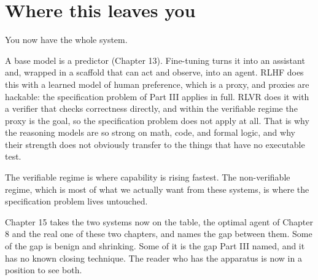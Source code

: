 \section*{Where this leaves you}

You now have the whole system.

A base model is a predictor (Chapter 13). Fine-tuning turns it into an assistant and, wrapped in a scaffold that can act and observe, into an agent. RLHF does this with a learned model of human preference, which is a proxy, and proxies are hackable: the specification problem of Part III applies in full. RLVR does it with a verifier that checks correctness directly, and within the verifiable regime the proxy is the goal, so the specification problem does not apply at all. That is why the reasoning models are so strong on math, code, and formal logic, and why their strength does not obviously transfer to the things that have no executable test.

The verifiable regime is where capability is rising fastest. The non-verifiable regime, which is most of what we actually want from these systems, is where the specification problem lives untouched.

Chapter 15 takes the two systems now on the table, the optimal agent of Chapter 8 and the real one of these two chapters, and names the gap between them. Some of the gap is benign and shrinking. Some of it is the gap Part III named, and it has no known closing technique. The reader who has the apparatus is now in a position to see both.
